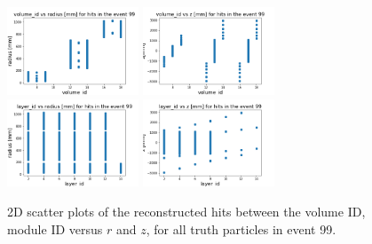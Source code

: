 \begin{figure}[!htb]
\centering
\includegraphics[width=0.35\textwidth]{plots/DataExploration_volume_id_r.png}
\includegraphics[width=0.35\textwidth]{plots/DataExploration_volume_id_z.png}\\
\includegraphics[width=0.35\textwidth]{plots/DataExploration_layer_id_r.png}
\includegraphics[width=0.35\textwidth]{plots/DataExploration_layer_id_z.png}
\caption{2D scatter plots of the reconstructed hits between the volume ID, module ID versus $r$ and $z$, for all truth particles in event 99.}
\label{fig:ScatterPlotHits}
\end{figure}

%



